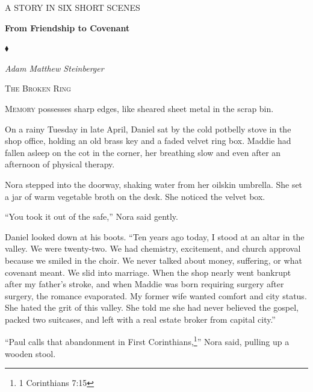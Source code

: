 \documentclass[11pt]{article}
\begin{document}
\begin{titlepage}
    \centering
    \vspace*{1.5in}
    {\scshape\footnotesize A STORY IN SIX SHORT SCENES\par}
    \vspace{0.8in}
    {\Huge\textbf{From Friendship to Covenant}\par}
    \vspace{0.3in}
    {\normalsize $\blacklozenge$\par}
    \vspace{0.4in}
    {\itshape\large Adam Matthew Steinberger\par}
    \vfill
\end{titlepage}

\newpage
\setcounter{page}{2}

\begin{center}
    {\scshape\large The Broken Ring}\par
    \vspace{0.2in}
\end{center}

\lettrine[lines=2,findent=2pt,nindent=0pt]{M}{emory} possesses sharp edges, like sheared sheet metal in the scrap bin.

On a rainy Tuesday in late April, Daniel sat by the cold potbelly stove in the shop office, holding an old brass key and a faded velvet ring box. Maddie had fallen asleep on the cot in the corner, her breathing slow and even after an afternoon of physical therapy.

Nora stepped into the doorway, shaking water from her oilskin umbrella. She set a jar of warm vegetable broth on the desk. She noticed the velvet box.

``You took it out of the safe,'' Nora said gently.

Daniel looked down at his boots. ``Ten years ago today, I stood at an altar in the valley. We were twenty-two. We had chemistry, excitement, and church approval because we smiled in the choir. We never talked about money, suffering, or what covenant meant. We slid into marriage. When the shop nearly went bankrupt after my father's stroke, and when Maddie was born requiring surgery after surgery, the romance evaporated. My former wife wanted comfort and city status. She hated the grit of this valley. She told me she had never believed the gospel, packed two suitcases, and left with a real estate broker from capital city.''

``Paul calls that abandonment in First Corinthians,\footnote{1 Corinthians 7:15}'' Nora said, pulling up a wooden stool.
\end{document}
